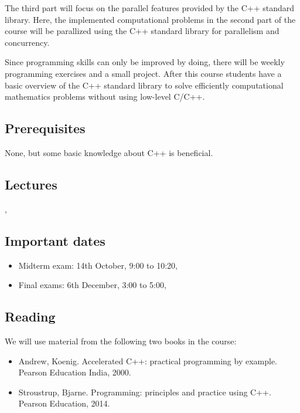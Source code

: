 \documentclass[11pt,letterpaper]{article}
\begin{document}
The third part will focus on the parallel features provided by the C++ standard library. Here, the implemented computational problems in the second part of the course will be parallized using the C++ standard library for parallelism and concurrency.

Since programming skills can only be improved by doing, there will be weekly programming exercises and a small project. After this course students have a basic overview of the C++ standard library to solve efficiently computational mathematics problems without using low-level C/C++.
\subsection*{Prerequisites}
None, but some basic knowledge about C++ is beneficial. 

\subsection*{Lectures}
\coursedate, \courselocation
\subsection*{Important dates}
\begin{itemize}
\item Midterm exam: 14th October, 9:00 to 10:20, \courselocation
\item Final exams: 6th December, 3:00 to 5:00, \courselocation
\end{itemize}
\subsection*{Reading}

We will use material from the following two books in the course:

\begin{itemize}
\item Andrew, Koenig. Accelerated C++: practical programming by example. Pearson Education India, 2000.
\item Stroustrup, Bjarne. Programming: principles and practice using C++. Pearson Education, 2014.
\end{itemize}
\end{document}
